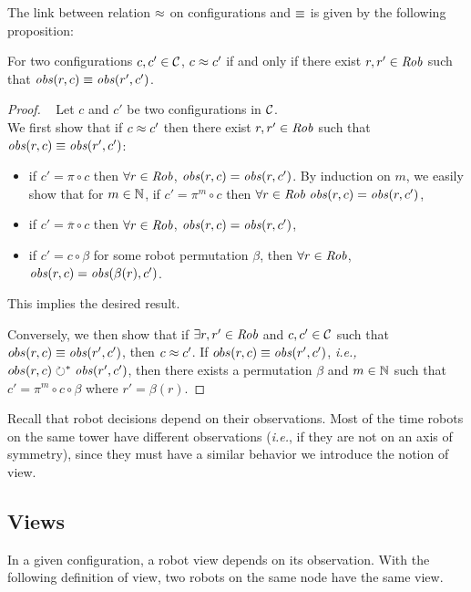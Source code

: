\smallskip The link between relation $\approx$ on configurations and $\equiv$ is given by the following proposition: 
\begin{proposition}
\label{prop:Oequ}
For two configurations $c, c' \in \mathcal{C}$, 
$c \approx c' $ if and only if there exist $r, r' \in \textit{Rob}$ such that  $\mathit{obs}(r,c)  \equiv \mathit{obs}(r',c')$.
\end{proposition}
\begin{proof}~
Let $c$ and $c'$ be two configurations in $\mathcal{C}$.\\
We first show that if
$c \approx c'$  then there exist $r, r' \in \textit{Rob}$ such that $\mathit{obs}(r,c)  \equiv \mathit{obs}(r',c')$: 
	\begin{itemize}
		\item if $c' = \pi \circ c$ then $\forall r \in \textit{Rob}$, $\mathit{obs}(r,c) = \mathit{obs}(r, c')$.
		By induction  on $m$, we easily show that for $m \in \mathbb{N}$, if $c' = \pi^m \circ c$ then $\forall r \in \textit{Rob}~\mathit{obs}(r,c) = \mathit{obs}(r, c')$,
		\item if $c' = \overline{\pi} \circ c$ then $\forall r \in \textit{Rob}$, $\mathit{obs}(r,c) = \mathit{obs}(r, c')$,
		\item  if $c' = c \circ \beta$ for some robot permutation $\beta$, then $\forall r \in \textit{Rob}$, $\mathit{obs}(r,c) = \mathit{obs}(\beta(r),c')$.
	\end{itemize}
	This implies the desired result.

Conversely, we then show that if $\exists r,r' \in \textit{Rob}$  and $c,c' \in \mathcal{C}$ 
such that $obs(r,c) \equiv \mathit{obs}(r',c')$, then $c \approx c'$.
If $obs(r,c) \equiv \mathit{obs}(r',c')$, \textit{i.e., } $obs(r,c) \circlearrowright^* \mathit{obs}(r',c')$, then there exists a permutation $\beta$
and $m \in \mathbb{N}$ such that $c' = \pi^m \circ c \circ \beta$ where $r' = \beta(r)$.
\end{proof}

Recall that robot decisions depend on their observations.  
Most of the time robots on the same tower have different observations (\textit{i.e.}, if they are not on an axis of symmetry), 
since they must have a similar behavior we introduce the notion of view.


\subsection{Views}
\label{subsubsec:view}
In a given configuration, a robot view  depends on its observation.
With the following definition of view, two
robots on the same node have the same view.

